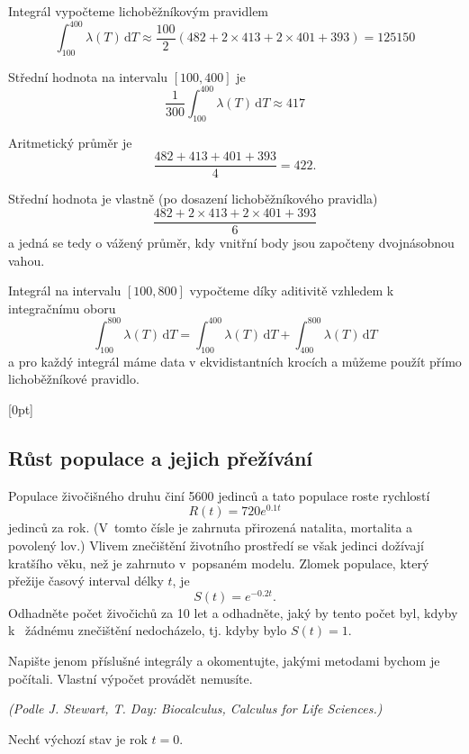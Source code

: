 \reseni

Integrál vypočteme lichoběžníkovým pravidlem
$$\int_{100}^{400}\lambda(T)\,\mathrm dT\approx
\frac {100}2(482+2\times 413+2\times401+393)=125150$$

Střední hodnota na intervalu $[100,400]$ je
$$\frac{1}{300}\int_{100}^{400}\lambda(T)\,\mathrm dT \approx 417$$

Aritmetický průměr je
$$\frac{482+413+401+393}4=422.$$

Střední hodnota je vlastně (po dosazení lichoběžníkového pravidla)
$$\frac {482+2\times 413+2\times401+393}6$$
a jedná se tedy o vážený průměr, kdy vnitřní body jsou započteny dvojnásobnou vahou.


Integrál na intervalu $[100,800]$ vypočteme díky aditivitě vzhledem k
integračnímu oboru
$$\int_{100}^{800}\lambda(T)\,\mathrm dT=\int_{100}^{400}\lambda(T)\,\mathrm dT+\int_{400}^{800}\lambda(T)\,\mathrm dT$$
a pro každý integrál máme data v ekvidistantních krocích a můžeme
použít přímo lichoběžníkové pravidlo.
\konec

\stranka





[0pt]

\def\mezera{\vspace*{10pt}}

\subsection{Růst populace a jejich přežívání}  Populace živočišného druhu
činí 5600 jedinců a tato populace roste rychlostí
$$R(t)=720 e^{0.1t}$$ jedinců za rok. (V tomto čísle je zahrnuta
přirozená natalita, mortalita a povolený lov.) Vlivem znečištění
životního prostředí se však jedinci dožívají kratšího věku, než je
zahrnuto v popsaném modelu. Zlomek populace, který přežije časový interval délky $t$,
je $$S(t)=e^{-0.2t}.$$ Odhadněte počet živočichů za 10 let a
odhadněte, jaký by tento počet byl, kdyby k~ žádnému znečištění
nedocházelo, tj. kdyby bylo $S(t)=1$.

Napište jenom příslušné integrály a okomentujte, jakými metodami
bychom je počítali. Vlastní výpočet provádět nemusíte.

\textit{(Podle J. Stewart, T. Day: Biocalculus,  Calculus for Life Sciences.)}

\reseni
Nechť výchozí stav je rok $t=0$.

